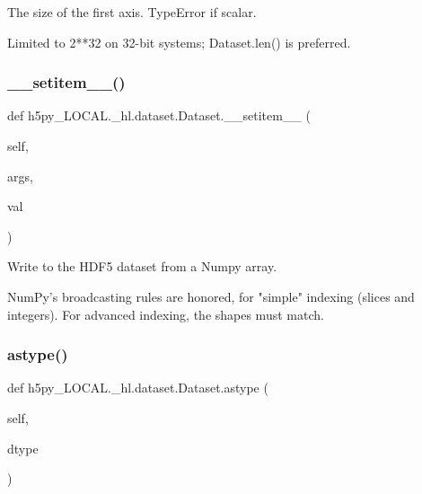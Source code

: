\begin{DoxyVerb}The size of the first axis.  TypeError if scalar.

Limited to 2**32 on 32-bit systems; Dataset.len() is preferred.
\end{DoxyVerb}
 \mbox{\label{classh5py__LOCAL_1_1__hl_1_1dataset_1_1Dataset_ad038305ebf6ba5d0defad4f883d07ec8}} 
\subsubsection{\texorpdfstring{\+\_\+\+\_\+setitem\+\_\+\+\_\+()}{\_\_setitem\_\_()}}
{\footnotesize\ttfamily def h5py\+\_\+\+L\+O\+C\+A\+L.\+\_\+hl.\+dataset.\+Dataset.\+\_\+\+\_\+setitem\+\_\+\+\_\+ (\begin{DoxyParamCaption}\item[{}]{self,  }\item[{}]{args,  }\item[{}]{val }\end{DoxyParamCaption})}

\begin{DoxyVerb}Write to the HDF5 dataset from a Numpy array.

NumPy's broadcasting rules are honored, for "simple" indexing
(slices and integers).  For advanced indexing, the shapes must
match.
\end{DoxyVerb}
 \mbox{\label{classh5py__LOCAL_1_1__hl_1_1dataset_1_1Dataset_ae631af1a42d79200fc28f15e1f966bbc}} 
\subsubsection{\texorpdfstring{astype()}{astype()}}
{\footnotesize\ttfamily def h5py\+\_\+\+L\+O\+C\+A\+L.\+\_\+hl.\+dataset.\+Dataset.\+astype (\begin{DoxyParamCaption}\item[{}]{self,  }\item[{}]{dtype }\end{DoxyParamCaption})}

